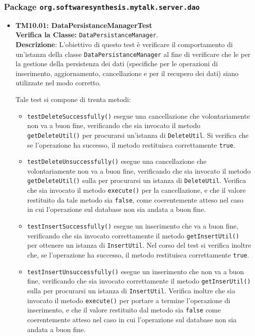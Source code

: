 \subsubsection{Package \texttt{org.softwaresynthesis.mytalk.server.dao}}
\begin{itemize}

\item[\passed] \textbf{TM10.01: DataPersistanceManagerTest}\\
\textbf{Verifica la Classe:} \texttt{DataPersistanceManager}.\\
\textbf{Descrizione}: L'obiettivo di questo test è verificare il comportamento di un'istanza della classe \texttt{DataPersistanceManager} al fine di verificare che le  per la gestione della persistenza dei dati (specifiche per le operazioni di inserimento, aggiornamento, cancellazione e per il recupero dei dati) siano utilizzate nel modo corretto.

Tale test si compone di trenta metodi:
\begin{itemize}

\item \texttt{testDeleteSuccessfully()} esegue una cancellazione che volontariamente non va a buon fine, verificando che sia invocato il metodo \texttt{getDeleteUtil()} per procurarsi un'istanza di \texttt{DeleteUtil}. Si verifica che se l'operazione ha successo, il metodo restituisca correttamente \texttt{true}.

\item \texttt{testDeleteUnsuccessfully()} esegue una cancellazione che volontariamente non va a buon fine, verificando che sia invocato il metodo \texttt{getDeleteUtil()} sulla  per procurarsi  un istanza di \texttt{DeleteUtil}. Verifica che sia invocato il metodo \texttt{execute()} per la cancellazione, e che il valore restituito da tale metodo sia \texttt{false}, come coerentemente atteso nel caso in cui l'operazione sul database non sia andata a buon fine.

\item \texttt{testInsertSuccessfully()} esegue un inserimento che va a buon fine, verificando che sia invocato correttamente il metodo \texttt{getInsertUtil()} per ottenere un istanza di \texttt{InsertUtil}. Nel corso del test si verifica inoltre che, se l'operazione ha successo, il metodo restituisca correttamente \texttt{true}.

\item \texttt{testInsertUnsuccessfully()} esegue un inserimento che non va a buon fine, verificando che sia invocato correttamente il metodo \texttt{getInserUtil()} sulla  per procurarsi un istanza di \texttt{InsertUtil}. Verifica inoltre che sia invocato il metodo \texttt{execute()} per portare a termine l'operazione di inserimento, e che il valore restituito dal metodo sia \texttt{false} come coerentemente atteso nel caso in cui l'operazione sul database non sia andata a buon fine.


\end{itemize}
\end{itemize}
